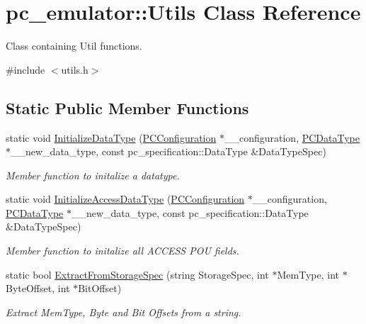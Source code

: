\hypertarget{classpc__emulator_1_1Utils}{}\section{pc\+\_\+emulator\+:\+:Utils Class Reference}
\label{classpc__emulator_1_1Utils}


Class containing Util functions.  




{\ttfamily \#include $<$utils.\+h$>$}

\subsection*{Static Public Member Functions}
\begin{DoxyCompactItemize}
\item 
static void \hyperlink{classpc__emulator_1_1Utils_a373cb0262a1769d303a228baf2b3c780}{Initialize\+Data\+Type} (\hyperlink{classpc__emulator_1_1PCConfiguration}{P\+C\+Configuration} $\ast$\+\_\+\+\_\+configuration, \hyperlink{classpc__emulator_1_1PCDataType}{P\+C\+Data\+Type} $\ast$\+\_\+\+\_\+new\+\_\+data\+\_\+type, const pc\+\_\+specification\+::\+Data\+Type \&Data\+Type\+Spec)
\begin{DoxyCompactList}\small\item\em Member function to initalize a datatype. \end{DoxyCompactList}\item 
static void \hyperlink{classpc__emulator_1_1Utils_a33ca522e76e1e97a58b44e75f51206a4}{Initialize\+Access\+Data\+Type} (\hyperlink{classpc__emulator_1_1PCConfiguration}{P\+C\+Configuration} $\ast$\+\_\+\+\_\+configuration, \hyperlink{classpc__emulator_1_1PCDataType}{P\+C\+Data\+Type} $\ast$\+\_\+\+\_\+new\+\_\+data\+\_\+type, const pc\+\_\+specification\+::\+Data\+Type \&Data\+Type\+Spec)
\begin{DoxyCompactList}\small\item\em Member function to initalize all A\+C\+C\+E\+SS P\+OU fields. \end{DoxyCompactList}\item 
static bool \hyperlink{classpc__emulator_1_1Utils_af667be4652205fad756b9a6ede0e568f}{Extract\+From\+Storage\+Spec} (string Storage\+Spec, int $\ast$Mem\+Type, int $\ast$Byte\+Offset, int $\ast$Bit\+Offset)
\begin{DoxyCompactList}\small\item\em Extract Mem\+Type, Byte and Bit Offsets from a string. \end{DoxyCompactList}\item 

\end{DoxyCompactItemize}
